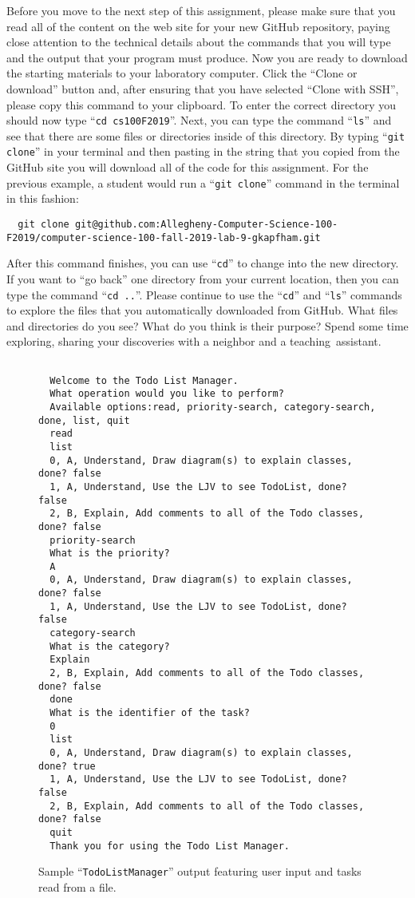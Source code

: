 \documentclass[11pt]{article}
\newcommand{\command}[1]{``\lstinline{#1}''}
\newcommand{\step}[1]{``{#1}''}
\begin{document}
Before you move to the next step of this assignment, please make sure that you
read all of the content on the web site for your new GitHub repository, paying
close attention to the technical details about the commands that you will type
and the output that your program must produce. Now you are ready to download the
starting materials to your laboratory computer. Click the ``Clone or download''
button and, after ensuring that you have selected ``Clone with SSH'', please
copy this command to your clipboard. To enter the correct directory you should
now type \command{cd cs100F2019}. Next, you can type the command \command{ls}
and see that there are some files or directories inside of this directory. By
typing \command{git clone} in your terminal and then pasting in the string that
you copied from the GitHub site you will download all of the code for this
assignment. For the previous example, a student would run a \command{git clone}
command in the terminal in this fashion:

\begin{lstlisting}
  git clone git@github.com:Allegheny-Computer-Science-100-F2019/computer-science-100-fall-2019-lab-9-gkapfham.git
\end{lstlisting}

After this command finishes, you can use \command{cd} to change into the new
directory. If you want to \step{go back} one directory from your current
location, then you can type the command \command{cd ..}. Please continue to use
the \command{cd} and \command{ls} commands to explore the files that you
automatically downloaded from GitHub. What files and directories do you see?
What do you think is their purpose? Spend some time exploring, sharing your
discoveries with a neighbor and a \mbox{teaching assistant}.

\begin{figure}[tb]
  \begin{Verbatim}[commandchars=\\\{\}]

  Welcome to the Todo List Manager.
  What operation would you like to perform?
  Available options:read, priority-search, category-search, done, list, quit
  read
  list
  0, A, Understand, Draw diagram(s) to explain classes, done? false
  1, A, Understand, Use the LJV to see TodoList, done? false
  2, B, Explain, Add comments to all of the Todo classes, done? false
  priority-search
  What is the priority?
  A
  0, A, Understand, Draw diagram(s) to explain classes, done? false
  1, A, Understand, Use the LJV to see TodoList, done? false
  category-search
  What is the category?
  Explain
  2, B, Explain, Add comments to all of the Todo classes, done? false
  done
  What is the identifier of the task?
  0
  list
  0, A, Understand, Draw diagram(s) to explain classes, done? true
  1, A, Understand, Use the LJV to see TodoList, done? false
  2, B, Explain, Add comments to all of the Todo classes, done? false
  quit
  Thank you for using the Todo List Manager.
\end{Verbatim}
\vspace*{-.1in}
\caption{Sample ``{\tt TodoListManager}'' output featuring user input and tasks read from a file.}
\label{fig:output}
\end{figure}
\end{document}
